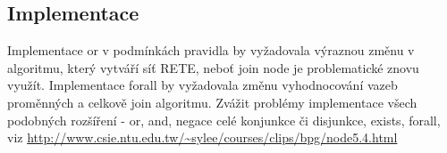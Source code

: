 \subsection{Implementace}
\begin{framed}
Implementace or v podmínkách pravidla by vyžadovala výraznou změnu v algoritmu,
který vytváří síť RETE, neboť join node je problematické znovu využít.
Implementace forall by vyžadovala změnu vyhodnocování vazeb proměnných a celkově
join algoritmu. Zvážit problémy implementace všech podobných rozšíření - or,
and, negace celé konjunkce či disjunkce, exists, forall, viz
\url{http://www.csie.ntu.edu.tw/~sylee/courses/clips/bpg/node5.4.html}
\end{framed}
